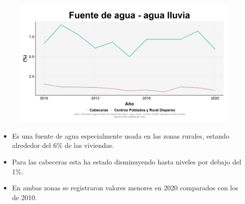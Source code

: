     \begin{figure}[H]
        \caption[Agua lluvia como fuentes de agua por zonas ]{\label{agua_lluvia_zonas} }
        \begin{center}
        \includegraphics[width=\textwidth,keepaspectratio]{img/var_140_trend.png}
        \end{center}
    \end{figure}
            \begin{itemize}
                    \item Es una fuente de agua especialmente usada en las zonas rurales, estando alrededor del 6\% de las viviendas.
                    \item Para las cabeceras esta ha estado disminuyendo hasta niveles por debajo del 1\%.
                    \item En ambas zonas se registraron valores menores en 2020 comparados con los de 2010.
                    \end{itemize}

